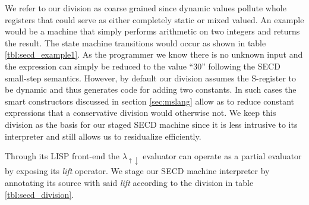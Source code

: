 \documentclass[a4paper,12pt,twoside,openright]{report}
\theoremstyle{definition}
\newcommand{\mslang}{$\lambda_{\uparrow\downarrow}$}
\begin{document}
We refer to our division as coarse grained since dynamic values pollute whole registers that could serve as either completely static or mixed valued. An example would be a machine that simply performs arithmetic on two integers and returns the result. The state machine transitions would occur as shown in table \ref{tbl:secd_example1}. As the programmer we know there is no unknown input and the expression can simply be reduced to the value ``30'' following the SECD small-step semantics. However, by default our division assumes the S-register to be dynamic and thus generates code for adding two constants. In such cases the smart constructors discussed in section \ref{sec:mslang} allow as to reduce constant expressions that a conservative division would otherwise not. We keep this division as the basis for our staged SECD machine since it is less intrusive to its interpreter and still allows us to residualize efficiently.

Through its LISP front-end the \mslang{} evaluator can operate as a partial evaluator by exposing its \textit{lift} operator. We stage our SECD machine interpreter by annotating its source with said \textit{lift} according to the division in table \ref{tbl:secd_division}.
\end{document}

